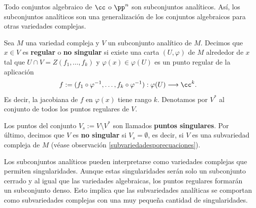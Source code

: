     Todo conjuntos algebraico de $\cc$ o $\pp^n$ son subconjuntos analíticos. Así, los subconjuntos analíticos son una generalización de los conjuntos algebraicos para otras variedades complejas.
    
    \begin{definition}[No singular]
    	Sea $M$ una variedad compleja y $V$ un subconjunto analítico de $M$. Decimos que $x\in V$ es \textbf{regular} o \textbf{no singular} si existe una carta $(U,\varphi)$ de $M$ alrededor de $x$ tal que $U\cap V=Z(f_1,\dots,f_k)$ y $\varphi(x)\in \varphi(U)$ es un punto regular de la aplicación
    	\begin{equation*}
    		f:=(f_1\circ\varphi^{-1},\dots,f_k\circ\varphi^{-1}):\varphi(U)\longrightarrow \cc^k.
    	\end{equation*}
    	Es decir, la jacobiana de $f$ en $\varphi(x)$ tiene rango $k$. Denotamos por $V^*$ al conjunto de todos los puntos regulares de $V$.
    	
    	Los puntos del conjunto $V_s:=V\setminus V^*$ son llamados \textbf{puntos singulares}. Por último, decimos que $V$ es \textbf{no singular} si $V_s=\emptyset$, es decir, si $V$ es una subvariedad compleja de $M$ (véase observación \ref{subvariedadesporecuaciones}).
    \end{definition}
    
    Los subconjuntos analíticos pueden interpretarse como variedades complejas que permiten singularidades. Aunque estas singularidades serán solo un subconjunto cerrado y al igual que las variedades algebraicas, los puntos regulares formarán un subconjunto denso. Esto implica que las subvariedades analíticas se comportan como subvariedades complejas con una muy pequeña cantidad de singularidades.
    
